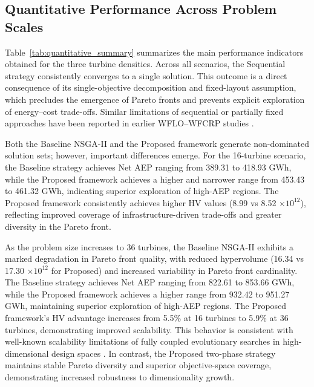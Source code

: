 \documentclass[format=sigconf,anonymous=true,review=true]{acmart}
\begin{document}
\subsection{Quantitative Performance Across Problem Scales}

Table~\ref{tab:quantitative_summary} summarizes the main performance indicators obtained for the three turbine densities. Across all scenarios, the Sequential strategy consistently converges to a single solution. This outcome is a direct consequence of its single-objective decomposition and fixed-layout assumption, which precludes the emergence of Pareto fronts and prevents explicit exploration of energy--cost trade-offs. Similar limitations of sequential or partially fixed approaches have been reported in earlier WFLO--WFCRP studies \cite{Fischetti2015MILP, Moon2015Optimal}.

Both the Baseline NSGA-II and the Proposed framework generate non-dominated solution sets; however, important differences emerge. For the 16-turbine scenario, the Baseline strategy achieves Net AEP ranging from 389.31 to 418.93 GWh, while the Proposed framework achieves a higher and narrower range from 453.43 to 461.32 GWh, indicating superior exploration of high-AEP regions. The Proposed framework consistently achieves higher HV values (8.99 vs 8.52 $\times 10^{12}$), reflecting improved coverage of infrastructure-driven trade-offs and greater diversity in the Pareto front.

As the problem size increases to 36 turbines, the Baseline NSGA-II exhibits a marked degradation in Pareto front quality, with reduced hypervolume (16.34 vs 17.30 $\times 10^{12}$ for Proposed) and increased variability in Pareto front cardinality. The Baseline strategy achieves Net AEP ranging from 822.61 to 853.66 GWh, while the Proposed framework achieves a higher range from 932.42 to 951.27 GWh, maintaining superior exploration of high-AEP regions. The Proposed framework's HV advantage increases from 5.5\% at 16 turbines to 5.9\% at 36 turbines, demonstrating improved scalability. This behavior is consistent with well-known scalability limitations of fully coupled evolutionary searches in high-dimensional design spaces \cite{Haupt2004, Nocedal2006}. In contrast, the Proposed two-phase strategy maintains stable Pareto diversity and superior objective-space coverage, demonstrating increased robustness to dimensionality growth.
\end{document}

